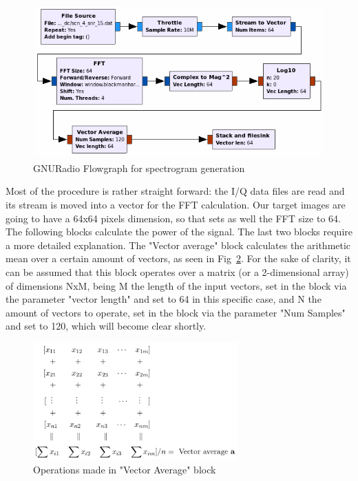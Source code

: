 \begin{figure}[!htb]
    \centering
    \includegraphics[width=\textwidth]{figures/specgram_generation}
    \caption{GNURadio Flowgraph for spectrogram generation}
    \label{fig:specgram_generation}
\end{figure}

Most of the procedure is rather straight forward: the I/Q data files are read and its stream is moved into a vector for the \ac{FFT} calculation. Our target images are going to have a 64x64 pixels dimension, so that sets as well the FFT size to 64. The following blocks calculate the power of the signal. The last two blocks require a more detailed explanation.
The "Vector average" block calculates the arithmetic mean over a certain amount of vectors, as seen in Fig~\ref{fig:vectoravg}. For the sake of clarity, it can be assumed that this block operates over a matrix (or a 2-dimensional array) of dimensions NxM, being M the length of the input vectors, set in the block via the parameter "vector length" and set to 64 in this specific case, and N the amount of vectors to operate, set in the block via the parameter "Num Samples" and set to 120, which will become clear shortly.\\

\begin{figure}[!htb]
    \centering
    \includegraphics[width=0.7\textwidth]{figures/vectoravg}
    \caption{Operations made in "Vector Average" block}
    \label{fig:vectoravg}
\end{figure}

